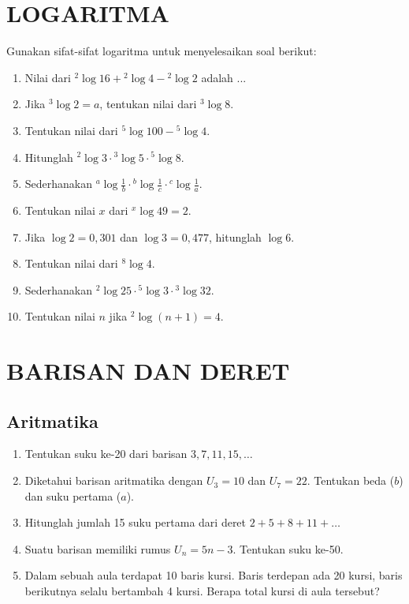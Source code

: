 \documentclass[12pt, a4paper]{article}
\begin{document}
\section{LOGARITMA}
Gunakan sifat-sifat logaritma untuk menyelesaikan soal berikut:
\begin{enumerate}
    \item Nilai dari ${}^2\log 16 + {}^2\log 4 - {}^2\log 2$ adalah ...
    \item Jika ${}^3\log 2 = a$, tentukan nilai dari ${}^3\log 8$.
    \item Tentukan nilai dari ${}^5\log 100 - {}^5\log 4$.
    \item Hitunglah ${}^2\log 3 \cdot {}^3\log 5 \cdot {}^5\log 8$.
    \item Sederhanakan ${}^a\log \frac{1}{b} \cdot {}^b\log \frac{1}{c} \cdot {}^c\log \frac{1}{a}$.
    \item Tentukan nilai $x$ dari ${}^x\log 49 = 2$.
    \item Jika $\log 2 = 0,301$ dan $\log 3 = 0,477$, hitunglah $\log 6$.
    \item Tentukan nilai dari ${}^8\log 4$.
    \item Sederhanakan ${}^2\log 25 \cdot {}^5\log 3 \cdot {}^3\log 32$.
    \item Tentukan nilai $n$ jika ${}^2\log (n+1) = 4$.
\end{enumerate}

\section{BARISAN DAN DERET}
\subsection{Aritmatika}
\begin{enumerate}
    \item Tentukan suku ke-20 dari barisan $3, 7, 11, 15, \dots$
    \item Diketahui barisan aritmatika dengan $U_3 = 10$ dan $U_7 = 22$. Tentukan beda ($b$) dan suku pertama ($a$).
    \item Hitunglah jumlah 15 suku pertama dari deret $2 + 5 + 8 + 11 + \dots$
    \item Suatu barisan memiliki rumus $U_n = 5n - 3$. Tentukan suku ke-50.
    \item Dalam sebuah aula terdapat 10 baris kursi. Baris terdepan ada 20 kursi, baris berikutnya selalu bertambah 4 kursi. Berapa total kursi di aula tersebut?
\end{enumerate}
\end{document}
